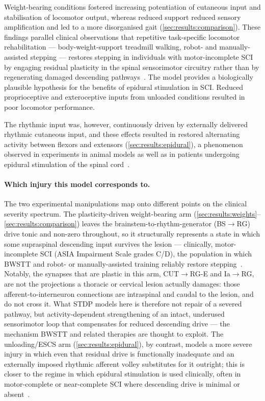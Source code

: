 Weight-bearing conditions fostered increasing potentiation of cutaneous
input and stabilisation of locomotor output, whereas reduced support
reduced sensory amplification and led to a more disorganised gait
(\autoref{sec:results:comparison}). These findings parallel clinical
observations that repetitive task-specific locomotor rehabilitation ---
body-weight-support treadmill walking, robot- and manually-assisted
stepping --- restores stepping in individuals with motor-incomplete SCI by
engaging residual plasticity in the spinal sensorimotor circuitry rather
than by regenerating damaged descending
pathways~\cite{wernigMuller1992,dietz1998,behrmanHarkema2000}. The model
provides a biologically plausible hypothesis for the benefits of epidural
stimulation in SCI. Reduced proprioceptive and exteroceptive inputs from
unloaded conditions resulted in poor locomotor performance.

The rhythmic input was, however, continuously driven by externally
delivered rhythmic cutaneous input, and these effects resulted in restored
alternating activity between flexors and extensors
(\autoref{sec:results:epidural}), a phenomenon observed in experiments in
animal models as well as in patients undergoing epidural stimulation of
the spinal cord~\cite{lavrov2008,edgerton2008,courtine2009,harkema2011}.

\paragraph{Which injury this model corresponds to.}
The two experimental manipulations map onto different points on the
clinical severity spectrum. The plasticity-driven weight-bearing arm
(\autoref{sec:results:weights}--\autoref{sec:results:comparison}) leaves
the brainstem-to-rhythm-generator (BS$\to$RG) drive tonic and non-zero
throughout, so it structurally represents a state in which some
supraspinal descending input survives the lesion --- clinically,
motor-incomplete SCI (ASIA Impairment Scale grades C/D), the population in
which BWSTT and robot- or manually-assisted training reliably restore
stepping~\cite{wernigMuller1992,dietz1998,behrmanHarkema2000}. Notably, the
synapses that are plastic in this arm, CUT$\to$RG-E and Ia$\to$RG, are not
the projections a thoracic or cervical lesion actually damages: those
afferent-to-interneuron connections are intraspinal and caudal to the
lesion, and do not cross it. What STDP models here is therefore not repair
of a severed pathway, but activity-dependent strengthening of an intact,
underused sensorimotor loop that compensates for reduced descending drive
--- the mechanism BWSTT and related therapies are thought to exploit. The
unloading/ESCS arm (\autoref{sec:results:epidural}), by contrast, models a
more severe injury in which even that residual drive is functionally
inadequate and an externally imposed rhythmic afferent volley substitutes
for it outright; this is closer to the regime in which epidural
stimulation is used clinically, often in motor-complete or near-complete
SCI where descending drive is minimal or absent~\cite{harkema2011}.

